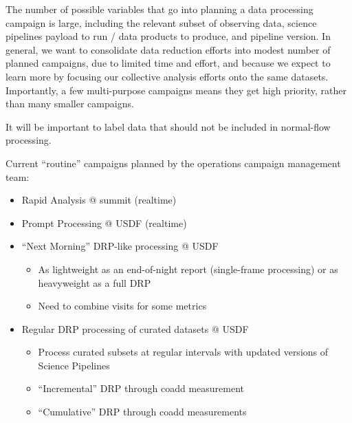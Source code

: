 \documentclass[SE,authoryear,toc,lsstdraft]{lsstdoc}
\begin{document}
The number of possible variables that go into planning a data processing campaign is large, including the relevant subset of observing data, science pipelines payload to run / data products to produce, and pipeline version.
In general, we want to consolidate data reduction efforts into modest number of planned campaigns, due to limited time and effort, and because we expect to learn more by focusing our collective analysis efforts onto the same datasets.
Importantly, a few multi-purpose campaigns means they get high priority, rather than many smaller campaigns.

It will be important to label data that should not be included in normal-flow processing.

Current ``routine'' campaigns planned by the operations campaign management team:

\begin{itemize}

  \item Rapid Analysis @ summit (realtime)

  \item Prompt Processing @ USDF (realtime)

  \item “Next Morning” DRP-like processing @ USDF

  \begin{itemize}

    \item As lightweight as an end-of-night report (single-frame processing) or as heavyweight as a full DRP

    \item Need to combine visits for some metrics

  \end{itemize}

  \item Regular DRP processing of curated datasets @ USDF

  \begin{itemize}

    \item Process curated subsets at regular intervals with updated versions of Science Pipelines

    \item ``Incremental'' DRP through coadd measurement

    \item ``Cumulative'' DRP through coadd measurements

  \end{itemize}

\end{itemize}
\end{document}
